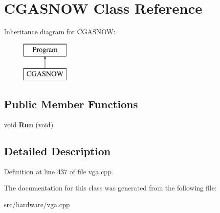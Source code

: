 \hypertarget{classCGASNOW}{\section{C\-G\-A\-S\-N\-O\-W Class Reference}
\label{classCGASNOW}
}
Inheritance diagram for C\-G\-A\-S\-N\-O\-W\-:\begin{figure}[H]
\begin{center}
\leavevmode
\includegraphics[height=2.000000cm]{classCGASNOW}
\end{center}
\end{figure}
\subsection*{Public Member Functions}
\begin{DoxyCompactItemize}
\item 
\hypertarget{classCGASNOW_a756619df2231c00d48df4bfec4a8965b}{void {\bfseries Run} (void)}\label{classCGASNOW_a756619df2231c00d48df4bfec4a8965b}

\end{DoxyCompactItemize}


\subsection{Detailed Description}


Definition at line 437 of file vga.\-cpp.



The documentation for this class was generated from the following file\-:\begin{DoxyCompactItemize}
\item 
src/hardware/vga.\-cpp\end{DoxyCompactItemize}
